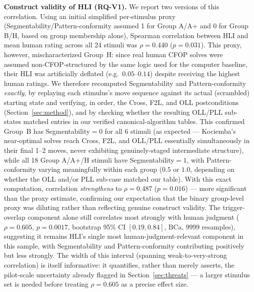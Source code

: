 \documentclass[10pt,conference]{article}
\begin{document}
\textbf{Construct validity of HLI (RQ-V1).} We report two versions
of this correlation. Using an initial simplified per-stimulus proxy
(Segmentability/Pattern-conformity assumed 1 for Group A/A+ and 0
for Group B/H, based on group membership alone), Spearman
correlation between HLI and mean human rating across all 24 stimuli
was $\rho=0.440$ ($p=0.031$). This proxy, however, mischaracterized
Group~H: since real human CFOP solves were assumed
non-CFOP-structured by the same logic used for the computer
baseline, their HLI was artificially deflated (e.g.\ $0.05$--$0.14$)
despite receiving the highest human ratings. We therefore recomputed
Segmentability and Pattern-conformity \emph{exactly}, by replaying
each stimulus's move sequence against its actual (scrambled) starting
state and verifying, in order, the Cross, F2L, and OLL
postconditions (Section~\ref{sec:method}), and by checking whether
the resulting OLL/PLL sub-states matched entries in our verified
canonical-algorithm tables. This confirmed Group~B has
Segmentability$=0$ for all 6 stimuli (as expected --- Kociemba's
near-optimal solves reach Cross, F2L, and OLL/PLL essentially
simultaneously in their final 1--2 moves, never exhibiting
genuinely-staged intermediate structure), while all 18 Group
A/A+/H stimuli have Segmentability$=1$, with Pattern-conformity
varying meaningfully within each group ($0.5$ or $1.0$, depending on
whether the OLL and/or PLL sub-case matched our table). With this
exact computation, correlation \emph{strengthens} to
$\rho=0.487$ ($p=0.016$) --- more significant than the proxy
estimate, confirming our expectation that the binary group-level
proxy was diluting rather than reflecting genuine construct
validity. The trigger-overlap component alone still correlates most
strongly with human judgment ($\rho=0.605$, $p=0.0017$, bootstrap
95\% CI $[0.19, 0.84]$, BCa, $9999$ resamples), suggesting
it remains HLI's single most human-judgment-relevant component in
this sample, with Segmentability and Pattern-conformity contributing
positively but less strongly. The width of this interval (spanning
weak-to-very-strong correlation) is itself informative: it quantifies,
rather than merely asserts, the pilot-scale uncertainty already
flagged in Section~\ref{sec:threats} --- a larger stimulus set is
needed before treating $\rho=0.605$ as a precise effect size.

\end{document}
